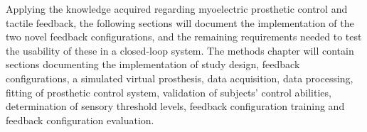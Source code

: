 

Applying the knowledge acquired regarding myoelectric prosthetic control and tactile feedback, the following sections will document the implementation of the two novel feedback configurations, and the remaining requirements needed to test the usability of these in a closed-loop system. The methods chapter will contain sections documenting the implementation of study design, feedback configurations, a simulated virtual prosthesis, data acquisition, data processing, fitting of prosthetic control system, validation of subjects' control abilities, determination of sensory threshold levels, feedback configuration training and feedback configuration evaluation.      